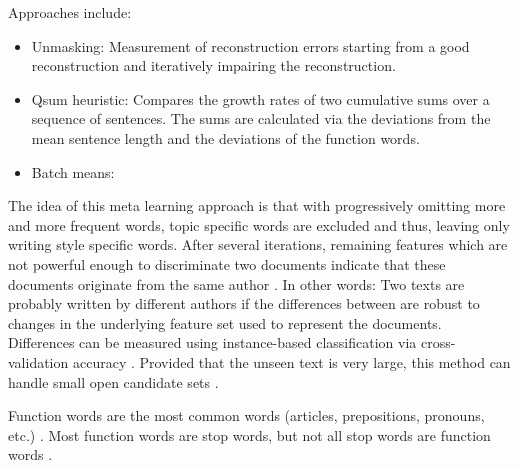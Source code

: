 \begin{definition}
    Approaches include:
    \begin{itemize}
        \item Unmasking: Measurement of reconstruction errors starting from a good reconstruction and iteratively impairing the reconstruction. %
        \item Qsum heuristic: Compares the growth rates of two cumulative sums over a sequence of sentences. The sums are calculated via the deviations from the mean sentence length and the deviations of the function words.
        \item Batch means: 
    \end{itemize}
\end{definition}

\begin{definition}
    [Unmasking]
    The idea of this meta learning approach is that with progressively omitting more and more frequent words, 
    topic specific words are excluded and thus, leaving only writing style specific words.
    After several iterations, remaining features which are not powerful enough to discriminate two documents indicate that 
    these documents originate from the same author \cite{stein_intrinsic_2011}.
    In other words: 
    Two texts are probably written by different authors if the differences between are robust to changes in the underlying feature set used to represent the documents.
    Differences can be measured using instance-based classification via cross-validation accuracy \cite{koppel_authorship_2011}.
    Provided that the unseen text is very large, this method can handle small open candidate sets \cite{koppel_authorship_2011}.
\end{definition}

\begin{definition}
    Function words are the most common words (articles, prepositions, pronouns, etc.) \cite{stamatatos_survey_2009}.
    Most function words are stop words, but not all stop words are function words \cite{stein_intrinsic_2011}.
\end{definition}


